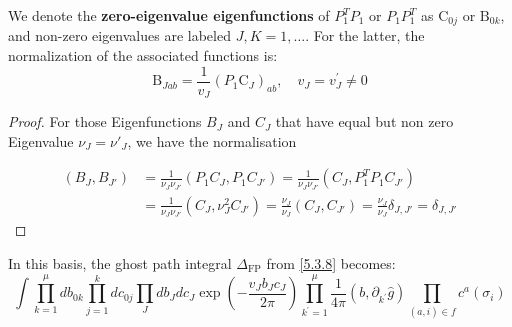 We denote the \textbf{zero-eigenvalue eigenfunctions} of $P_{1}^{T} P_{1}$ or $P_{1} P_{1}^{T}$ as $\mathrm{C}_{0 j}$ or $\mathrm{B}_{0 k}$, and non-zero eigenvalues are labeled $J, K=1, \ldots$. For the latter, the normalization of the associated functions is:
\begin{equation}
	\mathrm{B}_{J a b}=\frac{1}{v_{J}}\left(P_{1} \mathrm{C}_{J}\right)_{a b}, \quad v_{J}=v_{J}^{\prime} \neq 0\label{5.3.15}
\end{equation}
\begin{tcolorbox}[breakable]
	\begin{proof}
		For those Eigenfunctions \( B_J \) and \( C_J \) that have equal but non zero Eigenvalue \( \nu_J = \nu'_J \), we have the normalisation
		
		\begin{align}
			(B_J, B_{J'}) &= \frac{1}{\nu_J \nu_{J'}} (P_1 C_J, P_1 C_{J'}) = \frac{1}{\nu_J \nu_{J'}} (C_J, P_1^T P_1 C_{J'}) \nonumber \\
			&= \frac{1}{\nu_J \nu_{J'}} (C_J, \nu_J^2 C_{J'}) = \frac{\nu_J}{\nu_J} (C_J, C_{J'}) = \frac{\nu_J}{\nu_J} \delta_{J,J'} = \delta_{J,J'}
		\end{align}
	\end{proof}
\end{tcolorbox}
In this basis, the ghost path integral $\Delta_{\mathrm{FP}}$ from \eqref{5.3.8} becomes:
\begin{equation}
	\int \prod_{k=1}^{\mu} d b_{0 k} \prod_{j=1}^{k} d c_{0 j} \prod_{J} d b_{J} d c_{J} \exp \left(-\frac{v_{J} b_{J} c_{J}}{2 \pi}\right) \prod_{k^{\prime}=1}^{\mu} \frac{1}{4 \pi}\left(b, \partial_{k^{\prime}} \hat{g}\right) \prod_{(a, i) \in f} c^{a}\left(\sigma_{i}\right)
\end{equation}
